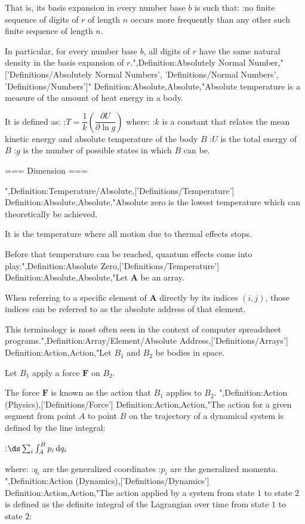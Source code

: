 That is,  its basis expansion in every number base $b$ is such that:
:no finite sequence of digits of $r$ of length $n$ occurs more frequently than any other such finite sequence of length $n$.


In particular, for every number base $b$, all digits of $r$ have the same natural density in the basis expansion of $r$.",Definition:Absolutely Normal Number,"['Definitions/Absolutely Normal Numbers', 'Definitions/Normal Numbers', 'Definitions/Numbers']"
Definition:Absolute,Absolute,"Absolute temperature is a measure of the amount of heat energy in a body.

It is defined as:
:$T = \dfrac 1 k \left( \dfrac {\partial U} {\partial \ln g}  \right)$
where:
:$k$ is a constant that relates the mean kinetic energy and absolute temperature of the body $B$
:$U$ is the total energy of $B$
:$g$ is the number of possible states in which $B$ can be.


=== Dimension ===

",Definition:Temperature/Absolute,['Definitions/Temperature']
Definition:Absolute,Absolute,"Absolute zero is the lowest temperature which can theoretically be achieved.

It is the temperature where all motion due to thermal effects stops.

Before that temperature can be reached, quantum effects come into play.",Definition:Absolute Zero,['Definitions/Temperature']
Definition:Absolute,Absolute,"Let $\mathbf A$ be an array.


When referring to a specific element of $\mathbf A$ directly by its indices $\left( i, j \right)$, those indices can be referred to as the absolute address of that element.

This terminology is most often seen in the context of computer spreadsheet programs.",Definition:Array/Element/Absolute Address,['Definitions/Arrays']
Definition:Action,Action,"Let $B_1$ and $B_2$ be bodies in space.

Let $B_1$ apply a force $\mathbf F$ on $B_2$.

The force $\mathbf F$ is known as the action that $B_1$ applies to $B_2$.
",Definition:Action (Physics),['Definitions/Force']
Definition:Action,Action,"The action for a given segment from point $A$ to point $B$ on the trajectory of a dynamical system is defined by the line integral:

:$\ds \sum_i \int_A^B p_i \,\mathrm d q_i$

where:
:$q_i$ are the generalized coordinates
:$p_i$ are the generalized momenta.
",Definition:Action (Dynamics),['Definitions/Dynamics']
Definition:Action,Action,"The action applied by a system from state $1$ to state $2$ is defined as the definite integral of the Lagrangian over time from state $1$ to state $2$:

